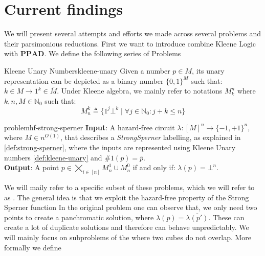 
\section{Current findings}                               
\label{sec:findings}
We will present several attempts and efforts we made across several problems and their
parsimonious reductions. First we want to introduce combine Kleene Logic with $\textbf{PPAD}$. 
We define the following series of Problems


\begin{definitionbox}{Kleene Unary Numbers}{kleene-unary}
    \label{def:kleene-unary}
    Given a number $p \in M$, its unary representation can be depicted as a binary number $\{0,1\}^M$ such that: $k \in M \to 1^k \in \bar{M}$.
    Under Kleene algebra, we mainly refer to notations $M_k^n$ where $k,n,M \in \mathbb{N}_0$  such that:
    $$
    M^k_n \triangleq \{1^j\bot^k \mid \forall j \in \mathbb{N}_0 : j + k \leq n\}
    $$
\end{definitionbox}



\begin{definitionbox}{ problem}{hf-strong-sperner}
    \textbf{Input}: A hazard-free circuit $\lambda: [M]^n \to \{-1, +1\}^n$, where $M \in n^{O(1)}$, that describes a \textit{StrongSperner} labelling,
    as explained in \ref{def:strong-sperner}, where the inputs are represented using Kleene Unary numbers \ref{def:kleene-unary}
    and $\#1(p) = \bar{p}$.\\
    \textbf{Output}: A point $p \in \bigtimes_{i \in [n]} M^1_n \cup M^0_n$ if and only if: $\lambda(p) =  \bot^n$. 
\end{definitionbox}

We will maily refer to a specific subset of these problems, which we will refer to as . 
The general idea is that we exploit the hazard-free property of the Strong Sperner function 
In the original problem %
one can observe that, we only need two points to create a panchromatic solution, where $\lambda(p) = \overline{\lambda(p')}$. These can create a lot of duplicate
solutions and therefore can behave unpredictably. We will mainly focus on subproblems of the  where two cubes do not overlap.
More formally we define


